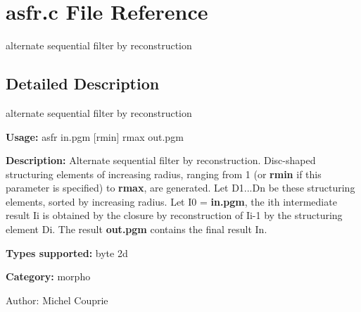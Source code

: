 \section{asfr.c File Reference}
\label{asfr_8c}
alternate sequential filter by reconstruction 



\subsection{Detailed Description}
alternate sequential filter by reconstruction 

{\bf Usage:} asfr in.pgm [rmin] rmax out.pgm

{\bf Description:} Alternate sequential filter by reconstruction. Disc-shaped structuring elements of increasing radius, ranging from 1 (or {\bf rmin} if this parameter is specified) to {\bf rmax}, are generated. Let D1...Dn be these structuring elements, sorted by increasing radius. Let I0 = {\bf in.pgm}, the ith intermediate result Ii is obtained by the closure by reconstruction of Ii-1 by the structuring element Di. The result {\bf out.pgm} contains the final result In.

{\bf Types supported:} byte 2d

{\bf Category:} morpho

\begin{Desc}
\item[Author:]Michel Couprie \end{Desc}
